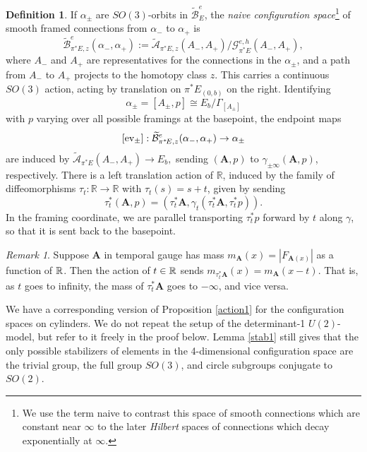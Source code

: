 \documentclass[10pt,a4paper]{amsart}
\newcommand{\pE}{\pi^* \! E}
\theoremstyle{definition}
\newtheorem{definition}[theorem]{Definition}
\theoremstyle{remark}
\newtheorem{remark}[theorem]{Remark}
\numberwithin{figure}{qchap}
\begin{document}
\begin{definition}\label{naiveconf}If $\alpha_\pm$ are $SO(3)$-orbits in $\widetilde{\mathcal B}^e_E$, the \textit{naive configuration space}\footnote{We use the term naive to contrast this space of smooth connections which are constant near $\infty$ to the later \textit{Hilbert} spaces of connections which decay exponentially at $\infty$.} of smooth framed connections from $\alpha_-$ to $\alpha_+$ is 
$$\widetilde{\mathcal B}^e_{\pE,z}(\alpha_-, \alpha_+) := \widetilde{\mathcal A}_{\pE,z}(A_-, A_+) / \mathcal G^{e,h}_{\pE}(A_-, A_+),$$ 
where $A_-$ and $A_+$ are representatives for the connections in the $\alpha_\pm$, and a path from $A_-$ to $A_+$ projects to the homotopy class $z$. This carries a continuous $SO(3)$ action, acting by translation on $\pE_{(0,b)}$ on the right. Identifying 
$$\alpha_\pm = [A_\pm, p] \cong E_b/\Gamma_{[A_\pm]}$$ 
with $p$ varying over all possible framings at the basepoint, the endpoint maps 
$$[\textup{ev}_{\pm}]: \widetilde{\mathcal B}^e_{\pE,z}(\alpha_-, \alpha_+) \to \alpha_\pm$$ 
are induced by $\widetilde{\mathcal A}_{\pE}(A_-, A_+) \to E_b,$ sending $(\mathbf{A}, p)$ to $\gamma_{\pm \infty}(\mathbf{A}, p)$, respectively. There is a left translation action of $\mathbb R$, induced by the family of diffeomorphisms $\tau_t: \mathbb R \to \mathbb R$ with $\tau_t(s) = s+t$, given by sending $$\tau_t^*(\mathbf{A}, p) = (\tau_t^* \mathbf{A}, \gamma_t(\tau_t^*\mathbf{A}, \tau_t^*p)).$$ In the framing coordinate, we are parallel transporting $\tau_t^*p$ forward by $t$ along $\gamma$, so that it is sent back to the basepoint.
\end{definition}

\begin{remark}\label{rmk:t-action}
Suppose $\mathbf{A}$ in temporal gauge has mass $m_{\mathbf A}(x) = |F_{\mathbf{A}(x)}|$ as a function of $\Bbb R$. Then the action of $t \in \Bbb R$ sends $m_{\tau_t^* \mathbf A}(x) = m_{\mathbf A}(x - t)$. That is, as $t$ goes to infinity, the mass of $\tau_t^* \mathbf{A}$ goes to $-\infty$, and vice versa.
\end{remark}

We have a corresponding version of Proposition \ref{action1} for the configuration spaces on cylinders. We do not repeat the setup of the determinant-1 $U(2)$-model, but refer to it freely in the proof below. Lemma \ref{stab1} still gives that the only possible stabilizers of elements in the 4-dimensional configuration space are the trivial group, the full group $SO(3)$, and circle subgroups conjugate to $SO(2)$.
\end{document}
